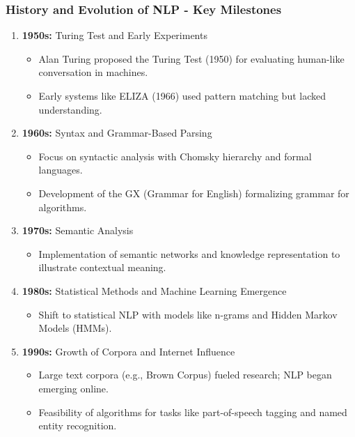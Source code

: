 \documentclass[aspectratio=169]{beamer}
\begin{document}
\begin{frame}[fragile]
    \frametitle{History and Evolution of NLP - Key Milestones}
    \begin{enumerate}
        \item \textbf{1950s:} Turing Test and Early Experiments
            \begin{itemize}
                \item Alan Turing proposed the Turing Test (1950) for evaluating human-like conversation in machines.
                \item Early systems like ELIZA (1966) used pattern matching but lacked understanding.
            \end{itemize}
        \item \textbf{1960s:} Syntax and Grammar-Based Parsing
            \begin{itemize}
                \item Focus on syntactic analysis with Chomsky hierarchy and formal languages.
                \item Development of the GX (Grammar for English) formalizing grammar for algorithms.
            \end{itemize}
        \item \textbf{1970s:} Semantic Analysis
            \begin{itemize}
                \item Implementation of semantic networks and knowledge representation to illustrate contextual meaning.
            \end{itemize}
        \item \textbf{1980s:} Statistical Methods and Machine Learning Emergence
            \begin{itemize}
                \item Shift to statistical NLP with models like n-grams and Hidden Markov Models (HMMs).
            \end{itemize}
        \item \textbf{1990s:} Growth of Corpora and Internet Influence
            \begin{itemize}
                \item Large text corpora (e.g., Brown Corpus) fueled research; NLP began emerging online.
                \item Feasibility of algorithms for tasks like part-of-speech tagging and named entity recognition.
            \end{itemize}
    \end{enumerate}
\end{frame}
\end{document}
